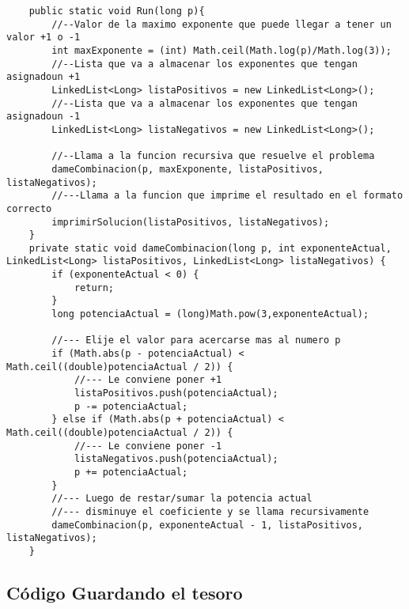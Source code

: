 	\begin{lstlisting}
    public static void Run(long p){
        //--Valor de la maximo exponente que puede llegar a tener un valor +1 o -1
        int maxExponente = (int) Math.ceil(Math.log(p)/Math.log(3));
        //--Lista que va a almacenar los exponentes que tengan asignadoun +1
        LinkedList<Long> listaPositivos = new LinkedList<Long>();
        //--Lista que va a almacenar los exponentes que tengan asignadoun -1
        LinkedList<Long> listaNegativos = new LinkedList<Long>();

        //--Llama a la funcion recursiva que resuelve el problema
        dameCombinacion(p, maxExponente, listaPositivos, listaNegativos);
        //---Llama a la funcion que imprime el resultado en el formato correcto
        imprimirSolucion(listaPositivos, listaNegativos);
    }
    private static void dameCombinacion(long p, int exponenteActual, LinkedList<Long> listaPositivos, LinkedList<Long> listaNegativos) {
        if (exponenteActual < 0) {
            return;
        }
        long potenciaActual = (long)Math.pow(3,exponenteActual);
        
        //--- Elije el valor para acercarse mas al numero p
        if (Math.abs(p - potenciaActual) < Math.ceil((double)potenciaActual / 2)) {
            //--- Le conviene poner +1
            listaPositivos.push(potenciaActual);
            p -= potenciaActual;
        } else if (Math.abs(p + potenciaActual) < Math.ceil((double)potenciaActual / 2)) {
            //--- Le conviene poner -1
            listaNegativos.push(potenciaActual);
            p += potenciaActual;
        }
        //--- Luego de restar/sumar la potencia actual
        //--- disminuye el coeficiente y se llama recursivamente
        dameCombinacion(p, exponenteActual - 1, listaPositivos, listaNegativos);
    }
	\end{lstlisting}

	
\subsection{C\'odigo Guardando el tesoro}
